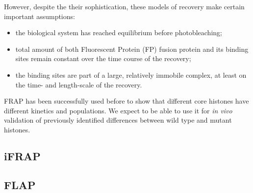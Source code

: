     However, despite the their sophistication, these models of recovery make certain
    important assumptions:
    \begin{itemize}
      \item the biological system has reached equilibrium before photobleaching;
      \item total amount of both Fluorescent Protein (FP) fusion protein and its
            binding sites remain constant over the time course of the recovery;
      \item the binding sites are part of a large, relatively immobile complex, at
            least on the time- and length-scale of the recovery.
    \end{itemize}

    FRAP has been successfully used before to show that different core histones have
    different kinetics and populations. We expect to be able to use it for \textit{in vivo}
    validation of previously identified differences between wild type and mutant histones.

  \subsection{iFRAP}
  \label{sec:iFRAP}

  \subsection{FLAP}











